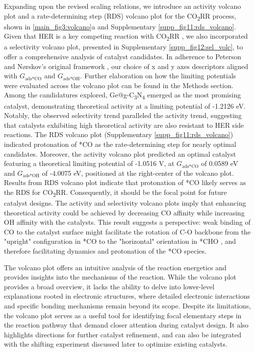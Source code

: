 Expanding upon the revised scaling relations, we introduce an activity volcano plot and a rate-determining step (RDS) volcano plot for the CO\textsubscript{2}RR process, shown in \cref{main_fig3:volcano}a and Supplementary \cref{supp_fig11:rds_volcano}.
Given that HER is a key competing reaction with CO\textsubscript{2}RR \cite{goyal2020competition}, we also incorporated a selectivity volcano plot, presented in Supplementary \cref{supp_fig12:sel_volc}, to offer a comprehensive analysis of catalyst candidates.
In adherence to Peterson and Nørskov's original framework \cite{peterson2012activity}, our choice of x and y axes descriptors aligned with $\textit{G}_{\text{ads} \ast \text{CO}}$ and $\textit{G}_{\text{ads} \ast \text{OH}}$.
Further elaboration on how the limiting potentials were evaluated across the volcano plot can be found in the Methods section.
Among the candidatures explored, Ge@g-C\textsubscript{3}N\textsubscript{4} emerged as the most promising catalyst, demonstrating theoretical activity at a limiting potential of -1.2126 eV.
Notably, the observed selectivity trend paralleled the activity trend, suggesting that catalysts exhibiting high theoretical activity are also resistant to HER side reactions.
The RDS volcano plot (Supplementary \cref{supp_fig11:rds_volcano}) indicated protonation of *CO as the rate-determining step for nearly optimal candidates.
Moreover, the activity volcano plot predicted an optimal catalyst featuring a theoretical limiting potential of -1.0516 V, at $\textit{G}_{\text{ads} \ast \text{CO}}$ of 0.0589 eV and $\textit{G}_{\text{ads} \ast \text{OH}}$ of -4.0075 eV, positioned at the right-center of the volcano plot.
Results from RDS volcano plot indicate that protonation of *CO likely serves as the RDS for CO\textsubscript{2}RR.
Consequently, it should be the focal point for future catalyst designs.
The activity and selectivity volcano plots imply that enhancing theoretical activity could be achieved by decreasing CO affinity while increasing OH affinity with the catalysts.
This result suggests a perspective: weak binding of CO to the catalyst surface might facilitate the rotation of C-O backbone from the "upright" configuration in *CO to the "horizontal" orientation in *CHO \cite{peterson2010copper},
and therefore facilitating dynamics and protonation of the *CO species.

The volcano plot offers an intuitive analysis of the reaction energetics and provides insights into the mechanisms of the reaction.
While the volcano plot provides a broad overview, it lacks the ability to delve into lower-level explanations rooted in electronic structures, where detailed electronic interactions and specific bonding mechanisms remain beyond its scope.
Despite its limitations, the volcano plot serves as a useful tool for identifying focal elementary steps in the reaction pathway that demand closer attention during catalyst design.
It also highlights directions for further catalyst refinement, and can also be integrated with the shifting experiment discussed later to optimize existing catalysts.

